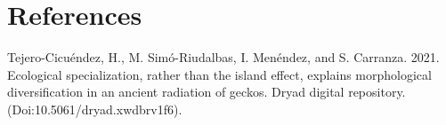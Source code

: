 \documentclass[
  11pt,
]{article}
\newlength{\cslhangindent}
\newlength{\cslentryspacingunit} %
\newenvironment{CSLReferences}[2] %
 {%
  \setlength{\parindent}{0pt}
  \ifodd #1
  \let\oldpar\par
  \def\par{\hangindent=\cslhangindent\oldpar}
  \fi
  \setlength{\parskip}{#2\cslentryspacingunit}
 }%
 {}
\begin{document}
\newpage

\hypertarget{references}{%
\section*{References}\label{references}}

\setlength{\parindent}{-0.25in} \setlength{\leftskip}{0.25in}
\setlength{\parskip}{8pt} \noindent

\hypertarget{refs}{}
\begin{CSLReferences}{1}{0}
\leavevmode{}%
Tejero-Cicuéndez, H., M. Simó-Riudalbas, I. Menéndez, and S. Carranza.
2021. Ecological specialization, rather than the island effect, explains
morphological diversification in an ancient radiation of geckos. Dryad
digital repository. (Doi:10.5061/dryad.xwdbrv1f6).

\end{CSLReferences}

\newpage
\end{document}
